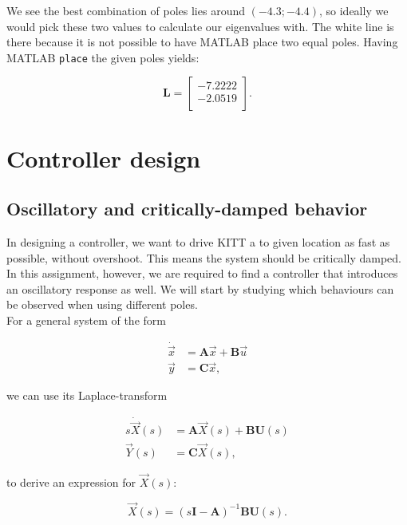 \documentclass[11pt,titlepage]{report}
\begin{document}
We see the best combination of poles lies around $(-4.3; -4.4)$, so ideally we would pick these two values to calculate our eigenvalues with. The white line is there because it is not possible to have MATLAB place two equal poles. Having MATLAB \texttt{place} the given poles yields:

\begin{equation}
	\mathbf{L} =
		\begin{bmatrix}
			-7.2222 \\
			-2.0519 \\
		\end{bmatrix}.
\end{equation}

\section{Controller design}
\subsection{Oscillatory and critically-damped behavior}
In designing a controller, we want to drive KITT a to given location as fast as possible, without overshoot. This means the system should be critically damped. In this assignment, however, we are required to find a controller that introduces an oscillatory response as well. We will start by studying which behaviours can be observed when using different poles.
\\
For a general system of the form

\begin{equation*}
	\begin{split}
		\dot{\vec{x}} &= \mathbf{A}\vec{x} + \mathbf{B}\vec{u} \\
		\vec{y} &= \mathbf{C}\vec{x},
	\end{split}
\end{equation*}

we can use its Laplace-transform

\begin{equation}
	\begin{split}
		s\dot{\vec{X}}(s) &= \mathbf{A}\vec{X}(s) + \mathbf{B}\mathbf{U}(s) \\
		\vec{Y}(s) &= \mathbf{C}\vec{X}(s),
	\end{split}
	\label{eq:ass2-system-laplace}
\end{equation}

to derive an expression for $\vec{X}(s)$:

\begin{equation}
	\vec{X}(s) = (s\mathbf{I} - \mathbf{A})^{-1}\mathbf{B}\mathbf{U}(s).
	\label{eq:ass2-Xs}
\end{equation}
\end{document}
